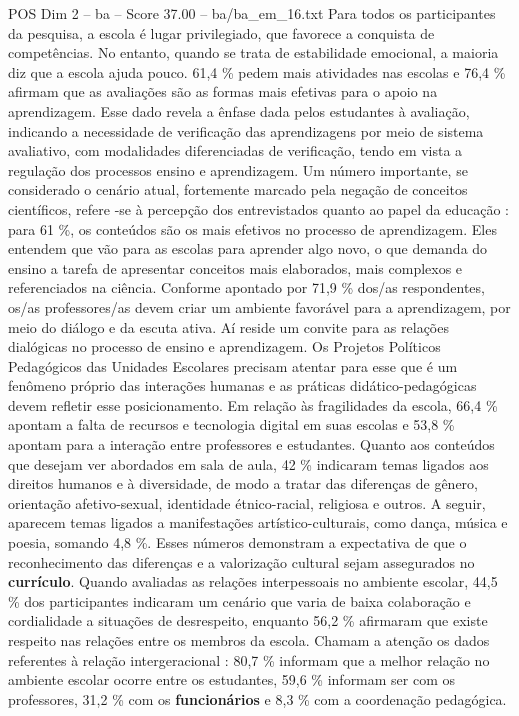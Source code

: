 \begin{textsample}{POS Dim 2 – ba – Score 37.00 – ba/ba\_em\_16.txt}
Para todos os participantes da pesquisa, a escola é lugar privilegiado, que favorece a conquista de competências.
No entanto, quando se trata de estabilidade emocional, a maioria diz que a escola ajuda pouco. 61,4 \% pedem mais atividades nas escolas e 76,4 \% afirmam que as avaliações são as formas mais efetivas para o apoio na aprendizagem.
Esse dado revela a ênfase dada pelos estudantes à avaliação, indicando a necessidade de verificação das aprendizagens por meio de sistema avaliativo, com modalidades diferenciadas de verificação, tendo em vista a regulação dos processos ensino e aprendizagem.
Um número importante, se considerado o cenário atual, fortemente marcado pela negação de conceitos científicos, refere -se à percepção dos entrevistados quanto ao papel da educação : para 61 \%, os conteúdos são os mais efetivos no processo de aprendizagem.
Eles entendem que vão para as escolas para aprender algo novo, o que demanda do ensino a tarefa de apresentar conceitos mais elaborados, mais complexos e referenciados na ciência.
Conforme apontado por 71,9 \% dos/as respondentes, os/as professores/as devem criar um ambiente favorável para a aprendizagem, por meio do diálogo e da escuta ativa.
Aí reside um convite para as relações dialógicas no processo de ensino e aprendizagem.
Os Projetos Políticos Pedagógicos das Unidades Escolares precisam atentar para esse que é um fenômeno próprio das interações humanas e as práticas didático-pedagógicas devem refletir esse posicionamento.
Em relação às fragilidades da escola, 66,4 \% apontam a falta de recursos e tecnologia digital em suas escolas e 53,8 \% apontam para a interação entre professores e estudantes.
Quanto aos conteúdos que desejam ver abordados em sala de aula, 42 \% indicaram temas ligados aos direitos humanos e à diversidade, de modo a tratar das diferenças de gênero, orientação afetivo-sexual, identidade étnico-racial, religiosa e outros.
A seguir, aparecem temas ligados a manifestações artístico-culturais, como dança, música e poesia, somando 4,8 \%.
Esses números demonstram a expectativa de que o reconhecimento das diferenças e a valorização cultural sejam assegurados no \textbf{currículo}.
Quando avaliadas as relações interpessoais no ambiente escolar, 44,5 \% dos participantes indicaram um cenário que varia de baixa colaboração e cordialidade a situações de desrespeito, enquanto 56,2 \% afirmaram que existe respeito nas relações entre os membros da escola.
Chamam a atenção os dados referentes à relação intergeracional : 80,7 \% informam que a melhor relação no ambiente escolar ocorre entre os estudantes, 59,6 \% informam ser com os professores, 31,2 \% com os \textbf{funcionários} e 8,3 \% com a coordenação pedagógica.

\end{textsample}
